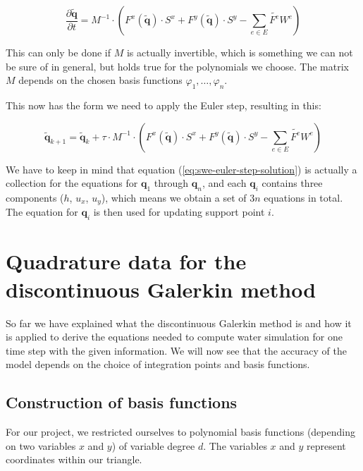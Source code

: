 \documentclass[a4paper, twoside]{article}
\newcommand{\pd}[2]{\dfrac{\partial #1}{\partial #2}}
\renewcommand{\phi}{\varphi}
\begin{document}
\begin{equation*}
  \pd{\tilde{\mathbf{q}}}{t} =
  M^{-1} \cdot \left(
    F^x(\tilde{\mathbf{q}}) \cdot S^x +
    F^y(\tilde{\mathbf{q}}) \cdot S^y -
    \sum_{e \in E} \tilde{F^e} W^e\right
  )
\end{equation*}

This can only be done if $M$ is actually invertible, which is something we can not be sure of in general, but holds true for the polynomials we choose.
The matrix $M$ depends on the chosen basis functions $\phi_1,\dots,\phi_n$.

This now has the form we need to apply the Euler step, resulting in this:

\begin{equation*}
  \label{eq:swe-euler-step-solution}
  \tilde{\mathbf{q}}_{k+1} =
  \tilde{\mathbf{q}}_{k} +
  \tau \cdot M^{-1} \cdot \left(
    F^x(\tilde{\mathbf{q}}) \cdot S^x +
    F^y(\tilde{\mathbf{q}}) \cdot S^y -
    \sum_{e \in E} \tilde{F^e} W^e\right
  )
\end{equation*}

We have to keep in mind that equation (\ref{eq:swe-euler-step-solution}) is actually a collection for the equations for $\mathbf{q}_1$ through $\mathbf{q}_n$, and each $\mathbf{q}_i$ contains three components ($h$, $u_x$, $u_y$), which means we obtain a set of $3n$ equations in total. The equation for $\mathbf{q}_i$ is then used for updating support point $i$.

\section{Quadrature data for the discontinuous Galerkin method}
\label{sec:basis-functions-choice}

So far we have explained what the discontinuous Galerkin method is and how it is applied to derive the equations needed to compute water simulation for one time step with the given information. We will now see that the accuracy of the model depends on the choice of integration points and basis functions.

\subsection{Construction of basis functions}
\label{sec:basis-functions-choice-polynomial}

For our project, we restricted ourselves to polynomial basis functions (depending on two variables $x$ and $y$) of variable degree $d$. The variables $x$ and $y$ represent coordinates within our triangle.
\end{document}
